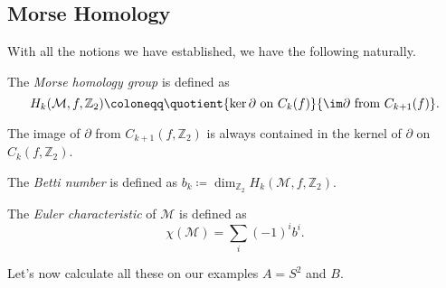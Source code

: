 \subsection{Morse Homology}
With all the notions we have established, we have the following naturally.

\begin{definition}\label{def:Morse-homology-group}
	The \emph{Morse homology group} is defined as
	\[
		H_k(\mathcal{M} , f, \mathbb{Z} _2) \coloneqq \quotient{\ker \partial \text{ on } C_k(f)}{\im \partial  \text{ from } C_{k+1}(f)}.
	\]
\end{definition}

\begin{remark}
	The image of \(\partial \) from \(C_{k+1}(f, \mathbb{Z} _2)\) is always contained in the kernel of \(\partial\) on \(C_k(f, \mathbb{Z} _2)\).
\end{remark}

\begin{definition}\label{def:Betti-number}
	The \emph{Betti number} is defined as \(b_k \coloneqq \dim _{\mathbb{Z} _2}H_k(\mathcal{M} , f, \mathbb{Z} _2)\).
\end{definition}

\begin{definition}\label{def:Euler-characteristic}
	The \emph{Euler characteristic} of \(\mathcal{M} \) is defined as
	\[
		\chi (\mathcal{M} ) = \sum_{i} (-1)^{i} b^i.
	\]
\end{definition}

Let's now calculate all these on our examples \(A = S^2\) and \(B\).

